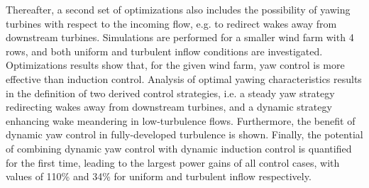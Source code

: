Thereafter, a second set of optimizations also includes the possibility of yawing turbines with respect to the incoming flow, e.g. to redirect wakes away from downstream turbines. Simulations are performed for a smaller wind farm with 4 rows, and both uniform and turbulent inflow conditions are investigated. Optimizations results show that, for the given wind farm, yaw control is more effective than induction control. Analysis of optimal yawing characteristics results in the definition of two derived control strategies, i.e. a steady yaw strategy redirecting wakes away from downstream turbines, and a dynamic strategy enhancing wake meandering in low-turbulence flows. Furthermore, the benefit of dynamic yaw control in fully-developed turbulence is shown. Finally, the potential of combining dynamic yaw control with dynamic induction control is quantified for the first time, leading to the largest power gains of all control cases, with values of 110\% and 34\% for uniform and turbulent inflow respectively. 



\cleardoublepage

